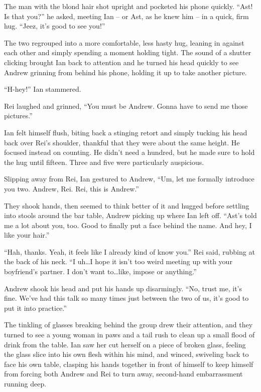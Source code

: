 The man with the blond hair shot upright and pocketed his phone quickly. ``Ast! Is that you?'' he asked, meeting Ian -- or Ast, as he knew him -- in a quick, firm hug. ``Jeez, it's good to see you!''

The two regrouped into a more comfortable, less hasty hug, leaning in against each other and simply spending a moment holding tight. The sound of a shutter clicking brought Ian back to attention and he turned his head quickly to see Andrew grinning from behind his phone, holding it up to take another picture.

``H-hey!'' Ian stammered.

Rei laughed and grinned, ``You must be Andrew. Gonna have to send me those pictures.''

Ian felt himself flush, biting back a stinging retort and simply tucking his head back over Rei's shoulder, thankful that they were about the same height. He focused instead on counting. He didn't need a hundred, but he made sure to hold the hug until fifteen. Three and five were particularly auspicious.

Slipping away from Rei, Ian gestured to Andrew, ``Um, let me formally introduce you two. Andrew, Rei. Rei, this is Andrew.''

They shook hands, then seemed to think better of it and hugged before settling into stools around the bar table, Andrew picking up where Ian left off. ``Ast's told me a lot about you, too. Good to finally put a face behind the name.  And hey, I like your hair.''

``Hah, thanks. Yeah, it feels like I already kind of know you.'' Rei said, rubbing at the back of his neck.  ``I uh\ldots{}I hope it isn't too weird meeting up with your boyfriend's partner. I don't want to\ldots{}like, impose or anything.''

Andrew shook his head and put his hands up disarmingly. ``No, trust me, it's fine. We've had this talk so many times just between the two of us, it's good to put it into practice.''

The tinkling of glasses breaking behind the group drew their attention, and they turned to see a young woman in paws and a tail rush to clean up a small flood of drink from the table. Ian saw her cut herself on a piece of broken glass, feeling the glass slice into his own flesh within his mind, and winced, swiveling back to face his own table, clasping his hands together in front of himself to keep himself from forcing both Andrew and Rei to turn away, second-hand embarrassment running deep.

